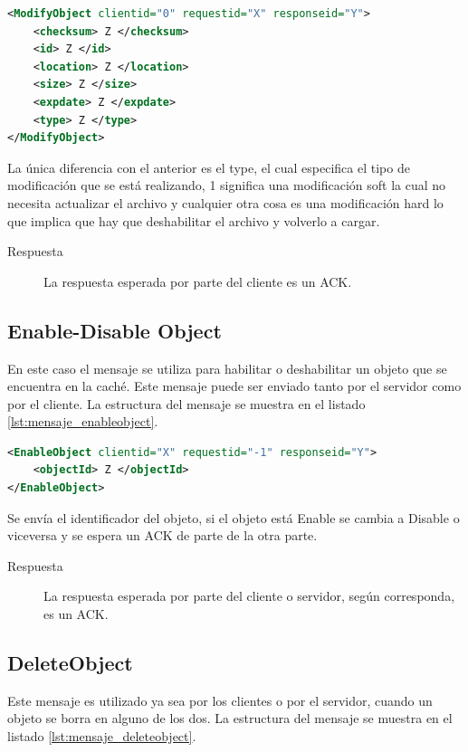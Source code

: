\begin{lstlisting}[language=XML,caption={Mensaje de ModifyObject},label={lst:mensaje_modifyobject}]
<ModifyObject clientid="0" requestid="X" responseid="Y"> 
	<checksum> Z </checksum>
	<id> Z </id>
	<location> Z </location>
	<size> Z </size>
	<expdate> Z </expdate>
	<type> Z </type>
</ModifyObject>
\end{lstlisting}

La única diferencia con el anterior es el type, el cual especifica el tipo de modificación que se está realizando, 1 significa una modificación soft la cual no necesita actualizar el archivo y cualquier otra cosa es una modificación hard lo que implica que hay que deshabilitar el archivo y volverlo a cargar.

\begin{description}
\item[Respuesta] La respuesta esperada por parte del cliente es un ACK.
\end{description}

\subsection{Enable-Disable Object}

En este caso el mensaje se utiliza para habilitar o deshabilitar un objeto que se encuentra en la caché. Este mensaje puede ser enviado tanto por el servidor como por el cliente. La estructura del mensaje se muestra en el listado \ref{lst:mensaje_enableobject}.

\begin{lstlisting}[language=XML,caption={Mensaje de EnableObject},label={lst:mensaje_enableobject}]
<EnableObject clientid="X" requestid="-1" responseid="Y"> 
	<objectId> Z </objectId>
</EnableObject>
\end{lstlisting}

Se envía el identificador del objeto, si el objeto está Enable se cambia a Disable o viceversa  y se espera un ACK de parte de la otra parte.

\begin{description}
\item[Respuesta] La respuesta esperada por parte del cliente o servidor, según corresponda, es un ACK.
\end{description}

\subsection{DeleteObject}
Este mensaje es utilizado ya sea por los clientes o por el servidor, cuando un objeto se borra en alguno de los dos. La estructura del mensaje se muestra en el listado \ref{lst:mensaje_deleteobject}.

